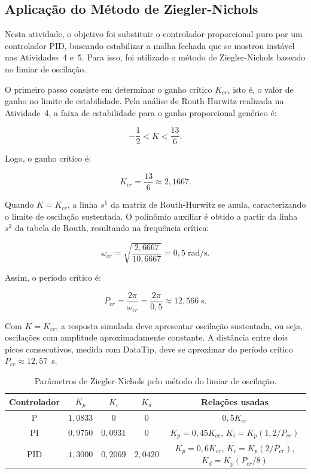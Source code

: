\documentclass[12pt,a4paper]{article}
\begin{document}
\subsection{Aplicação do Método de Ziegler-Nichols}

Nesta atividade, o objetivo foi substituir o controlador proporcional puro por um controlador PID, buscando estabilizar a malha fechada que se mostrou instável nas Atividades~4 e~5. Para isso, foi utilizado o método de Ziegler-Nichols baseado no limiar de oscilação.

O primeiro passo consiste em determinar o ganho crítico $K_{cr}$, isto é, o valor de ganho no limite de estabilidade. Pela análise de Routh-Hurwitz realizada na Atividade~4, a faixa de estabilidade para o ganho proporcional genérico é:

\begin{equation}
  -\frac{1}{2}<K<\frac{13}{6}.
\end{equation}

Logo, o ganho crítico é:

\begin{equation}
  K_{cr}=\frac{13}{6}\approx2{,}1667.
\end{equation}

Quando $K=K_{cr}$, a linha $s^1$ da matriz de Routh-Hurwitz se anula, caracterizando o limite de oscilação sustentada. O polinômio auxiliar é obtido a partir da linha $s^2$ da tabela de Routh, resultando na frequência crítica:

\begin{equation}
  \omega_{cr}=\sqrt{\frac{2{,}6667}{10{,}6667}}=0{,}5\;\text{rad/s}.
\end{equation}

Assim, o período crítico é:

\begin{equation}
  P_{cr}=\frac{2\pi}{\omega_{cr}}=\frac{2\pi}{0{,}5}\approx12{,}566\;\text{s}.
\end{equation}

Com $K=K_{cr}$, a resposta simulada deve apresentar oscilação sustentada, ou seja, oscilações com amplitude aproximadamente constante. A distância entre dois picos consecutivos, medida com DataTip, deve se aproximar do período crítico $P_{cr}\approx12{,}57$~s.

\begin{table}[H]
  \centering
  \caption{Parâmetros de Ziegler-Nichols pelo método do limiar de oscilação.}
  \label{tab:zn_q6}
  \begin{tabular}{ccccc}
    \toprule
    \textbf{Controlador} & $K_p$ & $K_i$ & $K_d$ & \textbf{Relações usadas} \\
    \midrule
    P   & $1{,}0833$ & $0$      & $0$      & $0{,}5K_{cr}$ \\
    PI  & $0{,}9750$ & $0{,}0931$ & $0$    & $K_p=0{,}45K_{cr}$, $K_i=K_p(1{,}2/P_{cr})$ \\
    PID & $1{,}3000$ & $0{,}2069$ & $2{,}0420$ & $K_p=0{,}6K_{cr}$, $K_i=K_p(2/P_{cr})$, $K_d=K_p(P_{cr}/8)$ \\
    \bottomrule
  \end{tabular}
\end{table}
\end{document}
